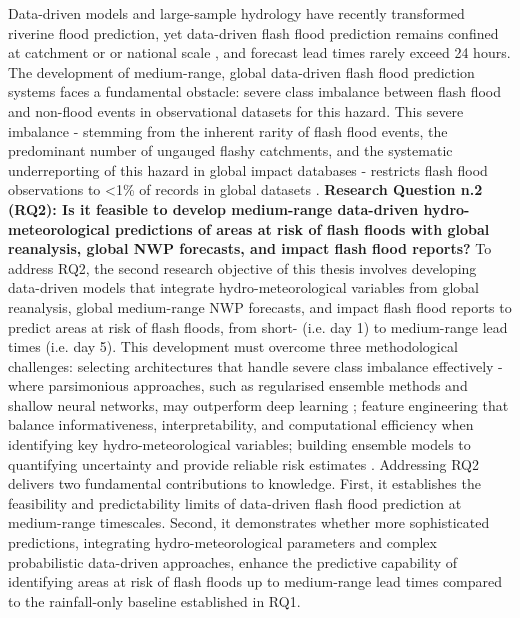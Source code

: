 Data-driven  models \citep{Nearing_2024} and large-sample hydrology \citep{Kratzert_2024} have recently transformed riverine flood prediction, yet data-driven flash flood prediction remains confined at catchment or \citep{Song_2020, Saleh_2024, Ding_2025, Zhao_2025} or national scale \citep{Zhao_2022}, and forecast lead times rarely exceed 24 hours. The development of medium-range, global data-driven flash flood prediction systems faces a fundamental obstacle: severe class imbalance between flash flood and non-flood events in observational datasets for this hazard. This severe imbalance - stemming from the inherent rarity of flash flood events, the predominant number of ungauged flashy catchments, and the systematic underreporting of this hazard in global impact databases - restricts flash flood observations to <1\% of records in global datasets \citep{Panwar_2020, Kratzert_2023, Färber_2024, Jonkman_2024}. \textcolor{colour_chapter6}{\textbf{Research Question n.2 (RQ2): Is it feasible to develop medium-range data-driven hydro-meteorological predictions of areas at risk of flash floods with global reanalysis, global NWP forecasts, and impact flash flood reports?}} To address RQ2, the second research objective of this thesis involves developing data-driven models that integrate hydro-meteorological variables from global reanalysis, global medium-range NWP forecasts, and impact flash flood reports to predict areas at risk of flash floods, from short- (i.e. day 1) to medium-range lead times (i.e. day 5). This development must overcome three methodological challenges: selecting architectures that handle severe class imbalance effectively - where parsimonious approaches, such as regularised ensemble methods and shallow neural networks, may outperform deep learning \citep{Kumar_2021, Xu_2022, Luo_2025a}; feature engineering that balance informativeness, interpretability, and computational efficiency when identifying key hydro-meteorological variables; building ensemble models to quantifying uncertainty and provide reliable risk estimates \citep{Saleh_2024}. Addressing RQ2 delivers two fundamental contributions to knowledge. First, it establishes the feasibility and predictability limits of data-driven flash flood prediction at medium-range timescales. Second, it demonstrates whether more sophisticated predictions, integrating hydro-meteorological parameters and complex probabilistic data-driven approaches, enhance the predictive capability of identifying areas at risk of flash floods up to medium-range lead times compared to the rainfall-only baseline established in RQ1. 

